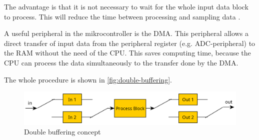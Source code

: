 The advantage is that it is not necessary to wait for the whole input data block to process.
This will reduce the time between processing and sampling data \cite{eetimes_fund_dsp}.

A useful peripheral in the mikrocontroller is the \ac{DMA}. This peripheral allows a
direct transfer of input data from the peripheral register (e.g. \ac{ADC}-peripheral) to the \ac{RAM} 
without the need of the \ac{CPU}. This saves computing time, because the \ac{CPU} can process
the data simultaneously to the transfer done by the \ac{DMA}.

The whole procedure is shown in \autoref{fig:double-buffering}.

\begin{figure}[!h]
    \centering
    \includegraphics[width=13cm]{img/double_buffering.PNG}
    \caption{Double buffering concept \cite{eetimes_fund_dsp}}
    \label{fig:double-buffering}
\end{figure}
